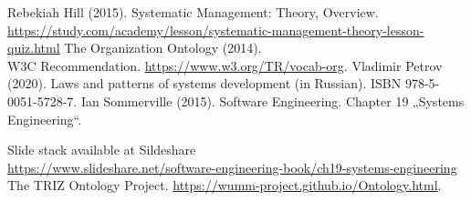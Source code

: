 \documentclass[11pt,a4paper]{article}
\begin{document}
\begin{thebibliography}{xxx}

 Rebekiah Hill (2015).  Systematic Management: Theory,
  Overview.\\{\small
  \url{https://study.com/academy/lesson/systematic-management-theory-lesson-quiz.html}}
 The Organization Ontology (2014).\\  W3C Recommendation.
  \url{https://www.w3.org/TR/vocab-org}.
 Vladimir Petrov (2020). Laws and patterns of systems
  development (in Russian). ISBN 978-5-0051-5728-7.
 Ian Sommerville (2015). Software Engineering.
  Chapter 19 „Systems Engineering“.

  Slide stack available at Sildeshare\\{\small
  \url{https://www.slideshare.net/software-engineering-book/ch19-systems-engineering}   }
 The TRIZ Ontology Project.
  \url{https://wumm-project.github.io/Ontology.html}.
\end{thebibliography}
\end{document}
